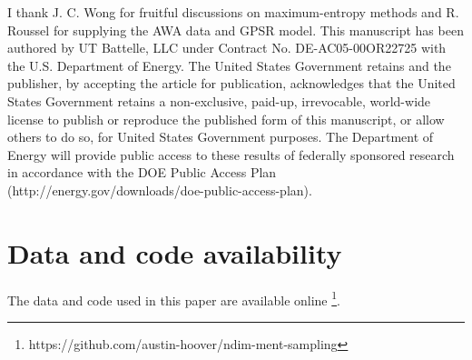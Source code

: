 \documentclass[%
    reprint,
    twocolumn,
    amsmath,
    amssymb,
    aps,
    prstab,
]{revtex4-2}
\begin{document}
I thank J. C. Wong for fruitful discussions on maximum-entropy methods and R. Roussel for supplying the AWA data and GPSR model. This manuscript has been authored by UT Battelle, LLC under Contract No. DE-AC05-00OR22725 with the U.S. Department of Energy. The United States Government retains and the publisher, by accepting the article for publication, acknowledges that the United States Government retains a non-exclusive, paid-up, irrevocable, world-wide license to publish or reproduce the published form of this manuscript, or allow others to do so, for United States Government purposes. The Department of Energy will provide public access to these results of federally sponsored research in accordance with the DOE Public Access Plan (http://energy.gov/downloads/doe-public-access-plan).


\section{Data and code availability}

The data and code used in this paper are available online \footnote{{https://github.com/austin-hoover/ndim-ment-sampling}}.



\end{document}

